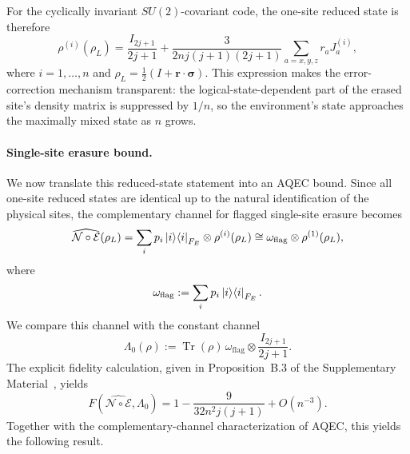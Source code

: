 \documentclass[10pt,twocolumn,superscriptaddress,aps,amsmath,amssymb,citeautoscript,floatfix,prx]{revtex4-2}
\theoremstyle{plain}
\theoremstyle{plain}
\theoremstyle{plain}
\theoremstyle{plain}
\theoremstyle{plain}
\theoremstyle{plain}
\begin{document}
For the cyclically invariant $SU(2)$-covariant code, the one-site reduced state is therefore
\begin{equation}\label{eq:reduced_state_su2}
    \rho^{(i)}(\rho_L)
    =
    \frac{I_{2j+1}}{2j+1}
    +
    \frac{3}{2nj(j+1)(2j+1)}
    \sum_{a=x,y,z} r_a J_a^{(i)},
\end{equation}
where $i=1,\ldots,n$ and $\rho_L=\frac12(I+\mathbf r\cdot\boldsymbol\sigma)$. This expression makes the error-correction mechanism transparent: the logical-state-dependent part of the erased site's density matrix is suppressed by $1/n$, so the environment's state approaches the maximally mixed state as $n$ grows.

\paragraph{Single-site erasure bound.}
We now translate this reduced-state statement into an AQEC bound. Since all one-site reduced states are identical up to the natural identification of the physical sites, the complementary channel for flagged single-site erasure becomes
\begin{equation}\label{eq:comp_chan_su2}
    \widehat{\mathcal N\circ\mathcal E}(\rho_L)
    =
    \sum_i p_i\ket i\!\bra i_{F_E}\otimes \rho^{(i)}(\rho_L)
    \cong
    \omega_{\mathrm{flag}}\otimes \rho^{(1)}(\rho_L),
\end{equation}
where
\[
    \omega_{\mathrm{flag}}
    :=
    \sum_i p_i\ket i\!\bra i_{F_E} .
\]
We compare this channel with the constant channel
\[
    \Lambda_0(\rho)
    :=
    \operatorname{Tr}(\rho)\,
    \omega_{\mathrm{flag}}\otimes \frac{I_{2j+1}}{2j+1} .
\]
The explicit fidelity calculation, given in Proposition~B.3 of the Supplementary Material~\cite{SuppMat}, yields
\begin{equation}\label{eq:fidelity_su2}
    F\!\left(\widehat{\mathcal N\circ\mathcal E},\Lambda_0\right)
    =
    1-
    \frac{9}{32n^2j(j+1)}
    +O(n^{-3}) .
\end{equation}
Together with the complementary-channel characterization of AQEC, this yields the following result.
\end{document}
